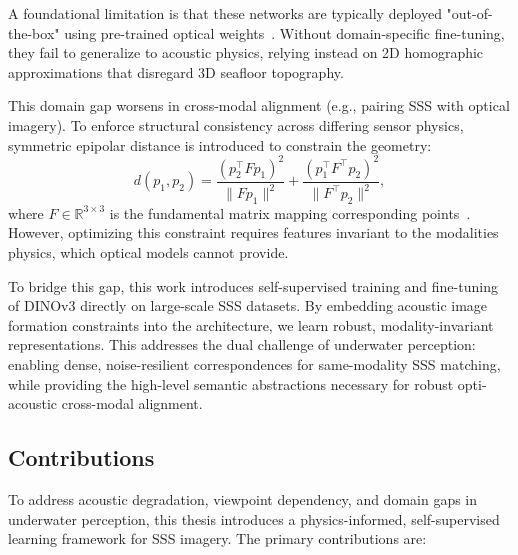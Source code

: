 \documentclass[12pt]{article}
\begin{document}
A foundational limitation is that these networks are typically deployed "out-of-the-box" using pre-trained optical weights~\cite{katrusha2025}. Without domain-specific fine-tuning, they fail to generalize to acoustic physics, relying instead on 2D homographic approximations that disregard 3D seafloor topography.

This domain gap worsens in cross-modal alignment (e.g., pairing SSS with optical imagery). To enforce structural consistency across differing sensor physics, symmetric epipolar distance is introduced to constrain the geometry:
\begin{equation}
d(p_1,p_2) = \frac{(p_2^\top F p_1)^2}{\|F p_1\|^2} + \frac{(p_1^\top F^\top p_2)^2}{\|F^\top p_2\|^2},
\end{equation}
where $F \in \mathbb{R}^{3 \times 3}$ is the fundamental matrix mapping corresponding points~\cite{fu2025}. However, optimizing this constraint requires features invariant to the modalities physics, which optical models cannot provide.

To bridge this gap, this work introduces self-supervised training and fine-tuning of DINOv3 directly on large-scale SSS datasets. By embedding acoustic image formation constraints into the architecture, we learn robust, modality-invariant representations. This addresses the dual challenge of underwater perception: enabling dense, noise-resilient correspondences for same-modality SSS matching, while providing the high-level semantic abstractions necessary for robust opti-acoustic cross-modal alignment.

\subsection{Contributions}
To address acoustic degradation, viewpoint dependency, and domain gaps in underwater perception, this thesis introduces a physics-informed, self-supervised learning framework for SSS imagery. The primary contributions are:
\end{document}
